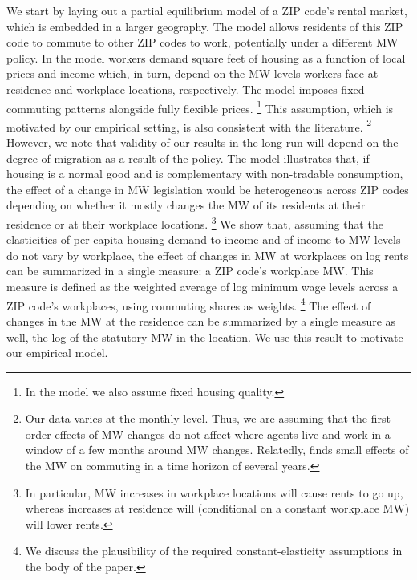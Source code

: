 We start by laying out a partial equilibrium model of a ZIP code's rental market,
which is embedded in a larger geography.
The model allows residents of this ZIP code to commute to other ZIP codes to 
work, potentially under a different MW policy.
In the model workers demand square feet of housing as a function of local prices 
and income which, in turn, depend on the MW levels workers face at residence and 
workplace locations, respectively.
The model imposes fixed commuting patterns alongside fully flexible prices.%
\footnote{In the model we also assume fixed housing quality.}
This assumption, which is motivated by our empirical setting, is also consistent 
with the literature.%
\footnote{Our data varies at the monthly level. 
Thus, we are assuming that the first order effects of MW changes do not affect 
where agents live and work in a window of a few months around MW changes.
Relatedly, \parencite{PerezPerez2021} finds small effects of the MW on commuting
in a time horizon of several years.}
However, we note that validity of our results in the long-run will depend on the
degree of migration as a result of the policy.
The model illustrates that, if housing is a normal good and is complementary 
with non-tradable consumption, the effect of a change in MW legislation 
would be heterogeneous across ZIP codes depending on whether it mostly changes 
the MW of its residents at their residence or at their workplace locations.%
\footnote{In particular, MW increases in workplace locations will cause rents to go up,
whereas increases at residence will (conditional on a constant workplace MW)
will lower rents.}
We show that, assuming that the elasticities of per-capita housing demand 
to income and of income to MW levels do not vary by workplace, the effect of 
changes in MW at workplaces on log rents can be summarized in a single measure:
a ZIP code's workplace MW.
This measure is defined as the weighted average of log minimum wage levels 
across a ZIP code's workplaces, using commuting shares as weights.%
\footnote{We discuss the plausibility of the required constant-elasticity 
assumptions in the body of the paper.}
The effect of changes in the MW at the residence can be summarized by
a single measure as well, the log of the statutory MW in the location.
We use this result to motivate our empirical model.


